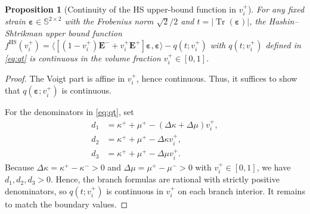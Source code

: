 \documentclass[preprint,3p]{elsarticle}
\newcommand{\tenss}[1]{\bm{\mathbf{#1}}}            %
\newcommand{\tensf}[1]{\bm{\mathbf{#1}}}            %
\newcommand{\strain}{\tenss{\varepsilon}}           %
\newcommand{\abstrstrain}{\lvert\operatorname{Tr}(\strain)\rvert}
\newcommand{\Emin}{\tensf{E}^{-}}                   %
\newcommand{\Emax}{\tensf{E}^{+}}                   %
\newtheorem{proposition}{Proposition}[section]
\begin{document}
\begin{proposition}[Continuity of the HS upper-bound function in $v_i^+$]\label{prop:hs_continuous}
    For any fixed strain $\strain \in \mathbb{S}^{2\times2}$ with the Frobenius norm $\sqrt{2}/2$ and $t = \abstrstrain$, the Hashin--Shtrikman upper bound function $f^{\mathrm{HS}} (v_i^+)=\langle [(1-v_i^+)\Emin + v_i^+ \Emax ]\strain,\strain \rangle - q(t;v_i^+)$ with $q(t;v_i^+)$ defined in \eqref{eq:qt} is continuous in the volume fraction $v_i^+ \in [0,1]$.
\end{proposition}
\begin{proof}
    The Voigt part is affine in $v_i^+$, hence continuous. Thus, it suffices to show that $q(\strain;v_i^+)$ is continuous.

    For the denominators in \eqref{eq:qt}, set
    \begin{subequations}
    \begin{align}
        d_1 &= \kappa^+ + \mu^+ - (\Delta\kappa + \Delta\mu) v_i^+,\\
        d_2 &= \kappa^+ + \mu^+ - \Delta\kappa v_i^+,\\
        d_3 &= \kappa^+ + \mu^+ - \Delta\mu v_i^+.
    \end{align}
    \end{subequations}
    Because $\Delta\kappa = \kappa^+-\kappa^- >0$ and $\Delta\mu = \mu^+ - \mu^- >0$ with $v_i^+\in[0,1]$, we have $d_1, d_2, d_3 > 0$. Hence, the branch formulas are rational with strictly positive denominators, so $q(t;v_i^+)$ is continuous in $v_i^+$ on each branch interior. It remains to match the boundary values.


\end{proof}
\end{document}
